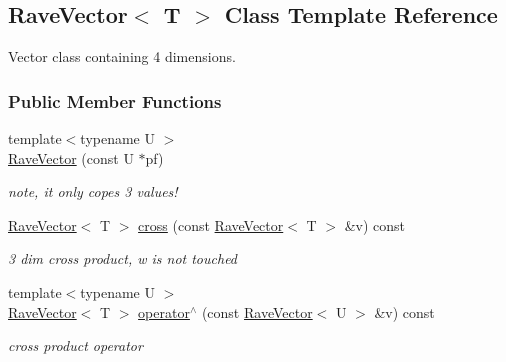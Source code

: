 \hypertarget{classOpenRAVE_1_1geometry_1_1RaveVector}{
\subsection{RaveVector$<$ T $>$ Class Template Reference}
\label{classOpenRAVE_1_1geometry_1_1RaveVector}
}


Vector class containing 4 dimensions.  


\subsubsection*{Public Member Functions}
\begin{DoxyCompactItemize}
\item 
\hypertarget{classOpenRAVE_1_1geometry_1_1RaveVector_afd7d78f59fbf96aeeba3ccea06b070f9}{
{\footnotesize template$<$typename U $>$ }\\\hyperlink{classOpenRAVE_1_1geometry_1_1RaveVector_afd7d78f59fbf96aeeba3ccea06b070f9}{RaveVector} (const U $\ast$pf)}
\label{classOpenRAVE_1_1geometry_1_1RaveVector_afd7d78f59fbf96aeeba3ccea06b070f9}

\begin{DoxyCompactList}\small\item\em note, it only copes 3 values! \item\end{DoxyCompactList}\item 
\hypertarget{classOpenRAVE_1_1geometry_1_1RaveVector_aaa077ecf3366c176cf3f108dfe56434b}{
\hyperlink{classOpenRAVE_1_1geometry_1_1RaveVector}{RaveVector}$<$ T $>$ \hyperlink{classOpenRAVE_1_1geometry_1_1RaveVector_aaa077ecf3366c176cf3f108dfe56434b}{cross} (const \hyperlink{classOpenRAVE_1_1geometry_1_1RaveVector}{RaveVector}$<$ T $>$ \&v) const }
\label{classOpenRAVE_1_1geometry_1_1RaveVector_aaa077ecf3366c176cf3f108dfe56434b}

\begin{DoxyCompactList}\small\item\em 3 dim cross product, w is not touched \item\end{DoxyCompactList}\item 
\hypertarget{classOpenRAVE_1_1geometry_1_1RaveVector_ad293e3fe3c67f1817ae79697cf4851fc}{
{\footnotesize template$<$typename U $>$ }\\\hyperlink{classOpenRAVE_1_1geometry_1_1RaveVector}{RaveVector}$<$ T $>$ \hyperlink{classOpenRAVE_1_1geometry_1_1RaveVector_ad293e3fe3c67f1817ae79697cf4851fc}{operator$^\wedge$} (const \hyperlink{classOpenRAVE_1_1geometry_1_1RaveVector}{RaveVector}$<$ U $>$ \&v) const }
\label{classOpenRAVE_1_1geometry_1_1RaveVector_ad293e3fe3c67f1817ae79697cf4851fc}

\begin{DoxyCompactList}\small\item\em cross product operator \item\end{DoxyCompactList}\end{DoxyCompactItemize}


